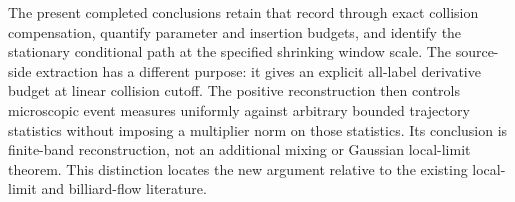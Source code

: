 \documentclass[11pt,reqno]{amsart}
\numberwithin{equation}{section}
\theoremstyle{definition}\newtheorem{definition}[theorem]{Definition}
\theoremstyle{remark}\newtheorem{remark}[theorem]{Remark}
\begin{document}
The present completed conclusions retain that record through exact
collision compensation, quantify parameter and insertion budgets, and
identify the stationary conditional path at the specified shrinking
window scale. The source-side extraction has a different purpose: it
gives an explicit all-label derivative budget at linear collision
cutoff. The positive reconstruction then controls microscopic event
measures uniformly against arbitrary bounded trajectory statistics
without imposing a multiplier norm on those statistics. Its conclusion
is finite-band reconstruction, not an additional mixing or Gaussian
local-limit theorem. This distinction locates the new argument relative
to the existing local-limit and billiard-flow literature.


















\end{document}

